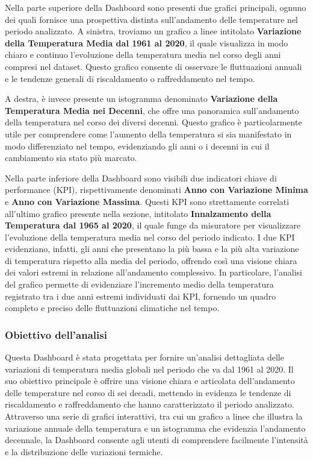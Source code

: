 Nella parte superiore della Dashboard sono presenti due grafici principali, ognuno dei quali fornisce una prospettiva distinta sull'andamento delle temperature nel periodo analizzato. A sinistra, troviamo un grafico a linee intitolato \textbf{Variazione della Temperatura Media dal 1961 al 2020}, il quale visualizza in modo chiaro e continuo l'evoluzione della temperatura media nel corso degli anni compresi nel dataset. Questo grafico consente di osservare le fluttuazioni annuali e le tendenze generali di riscaldamento o raffreddamento nel tempo.

A destra, è invece presente un istogramma denominato \textbf{Variazione della Temperatura Media nei Decenni}, che offre una panoramica sull'andamento della temperatura nel corso dei diversi decenni. Questo grafico è particolarmente utile per comprendere come l'aumento della temperatura si sia manifestato in modo differenziato nel tempo, evidenziando gli anni o i decenni in cui il cambiamento sia stato più marcato. 

Nella parte inferiore della Dashboard sono visibili due indicatori chiave di performance (KPI), rispettivamente denominati \textbf{Anno con Variazione Minima} e \textbf{Anno con Variazione Massima}. Questi KPI sono strettamente correlati all'ultimo grafico presente nella sezione, intitolato \textbf{Innalzamento della Temperatura dal 1965 al 2020}, il quale funge da misuratore per visualizzare l'evoluzione della temperatura media nel corso del periodo indicato. I due KPI evidenziano, infatti, gli anni che presentano la più bassa e la più alta variazione di temperatura rispetto alla media del periodo, offrendo così una visione chiara dei valori estremi in relazione all'andamento complessivo. In particolare, l'analisi del grafico permette di evidenziare l'incremento medio della temperatura registrato tra i due anni estremi individuati dai KPI, fornendo un quadro completo e preciso delle fluttuazioni climatiche nel tempo. 

\subsubsection{Obiettivo dell'analisi}
Questa Dashboard è stata progettata per fornire un'analisi dettagliata delle variazioni di temperatura media globali nel periodo che va dal 1961 al 2020. Il suo obiettivo principale è offrire una visione chiara e articolata dell'andamento delle temperature nel corso di sei decadi, mettendo in evidenza le tendenze di riscaldamento e raffreddamento che hanno caratterizzato il periodo analizzato. Attraverso una serie di grafici interattivi, tra cui un grafico a linee che illustra la variazione annuale della temperatura e un istogramma che evidenzia l'andamento decennale, la Dashboard consente agli utenti di comprendere facilmente l'intensità e la distribuzione delle variazioni termiche.

